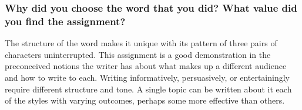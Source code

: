 \documentclass[12pt]{article}
\begin{document}
\subsubsection{Why did you choose the word that you did? What value did you find the assignment?}

The structure of the word makes it unique with its pattern of three pairs of characters uninterrupted.
This assignment is a good demonstration in the preconceived notions the writer has about what makes up a different audience and how to write to each.
Writing informatively, persuasively, or entertainingly require different structure and tone.
A single topic can be written about it each of the styles with varying outcomes, perhaps some more effective than others.
\end{document}
